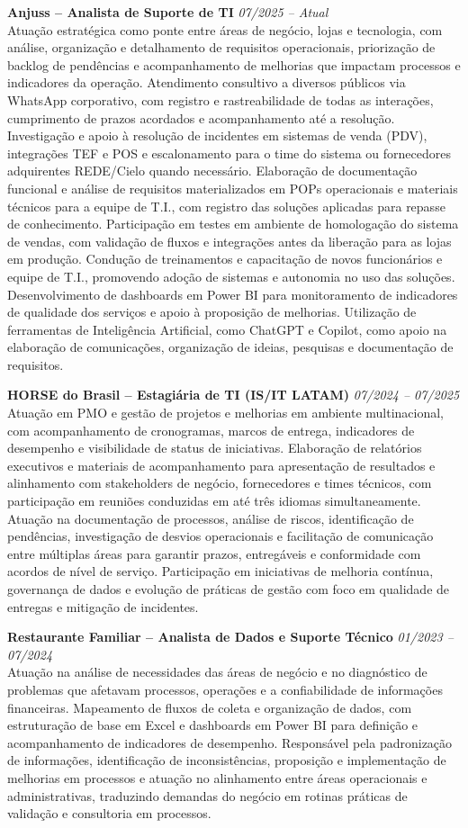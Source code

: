 \documentclass[11pt,a4paper]{article}
\newcommand{\experience}[3]{%
  \textbf{#1} \hfill \textit{#2}\\[4pt]
  #3
  \vspace{8pt}
}
\begin{document}
\experience{Anjuss -- Analista de Suporte de TI}{07/2025 -- Atual}{%
Atuação estratégica como ponte entre áreas de negócio, lojas e tecnologia, com análise, organização e detalhamento de requisitos operacionais, priorização de backlog de pendências e acompanhamento de melhorias que impactam processos e indicadores da operação. Atendimento consultivo a diversos públicos via WhatsApp corporativo, com registro e rastreabilidade de todas as interações, cumprimento de prazos acordados e acompanhamento até a resolução. Investigação e apoio à resolução de incidentes em sistemas de venda (PDV), integrações TEF e POS e escalonamento para o time do sistema ou fornecedores adquirentes REDE/Cielo quando necessário. Elaboração de documentação funcional e análise de requisitos materializados em POPs operacionais e materiais técnicos para a equipe de T.I., com registro das soluções aplicadas para repasse de conhecimento. Participação em testes em ambiente de homologação do sistema de vendas, com validação de fluxos e integrações antes da liberação para as lojas em produção. Condução de treinamentos e capacitação de novos funcionários e equipe de T.I., promovendo adoção de sistemas e autonomia no uso das soluções. Desenvolvimento de dashboards em Power BI para monitoramento de indicadores de qualidade dos serviços e apoio à proposição de melhorias. Utilização de ferramentas de Inteligência Artificial, como ChatGPT e Copilot, como apoio na elaboração de comunicações, organização de ideias, pesquisas e documentação de requisitos.}

\experience{HORSE do Brasil -- Estagiária de TI (IS/IT LATAM)}{07/2024 -- 07/2025}{%
Atuação em PMO e gestão de projetos e melhorias em ambiente multinacional, com acompanhamento de cronogramas, marcos de entrega, indicadores de desempenho e visibilidade de status de iniciativas. Elaboração de relatórios executivos e materiais de acompanhamento para apresentação de resultados e alinhamento com stakeholders de negócio, fornecedores e times técnicos, com participação em reuniões conduzidas em até três idiomas simultaneamente. Atuação na documentação de processos, análise de riscos, identificação de pendências, investigação de desvios operacionais e facilitação de comunicação entre múltiplas áreas para garantir prazos, entregáveis e conformidade com acordos de nível de serviço. Participação em iniciativas de melhoria contínua, governança de dados e evolução de práticas de gestão com foco em qualidade de entregas e mitigação de incidentes.}

\experience{Restaurante Familiar -- Analista de Dados e Suporte Técnico}{01/2023 -- 07/2024}{%
Atuação na análise de necessidades das áreas de negócio e no diagnóstico de problemas que afetavam processos, operações e a confiabilidade de informações financeiras. Mapeamento de fluxos de coleta e organização de dados, com estruturação de base em Excel e dashboards em Power BI para definição e acompanhamento de indicadores de desempenho. Responsável pela padronização de informações, identificação de inconsistências, proposição e implementação de melhorias em processos e atuação no alinhamento entre áreas operacionais e administrativas, traduzindo demandas do negócio em rotinas práticas de validação e consultoria em processos.}
\end{document}
